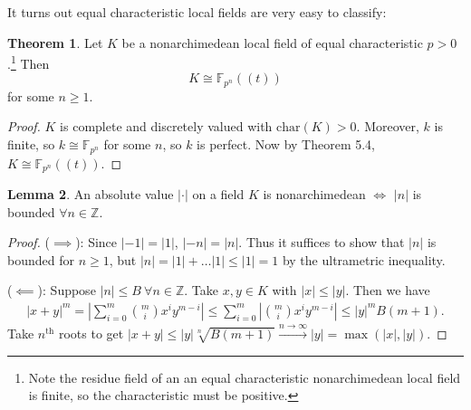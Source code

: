 \documentclass{article}
\theoremstyle{definition}
\newtheorem{theorem}{Theorem}[section]
\newtheorem{lemma}[theorem]{Lemma}
\begin{document}
It turns out equal characteristic local fields are very easy to classify:
\begin{theorem}
    Let $K$ be a nonarchimedean local field of equal characteristic $p>0$.\footnote{Note the residue field of an an equal characteristic nonarchimedean local field is finite, so the characteristic must be positive.} Then \[
    K \cong \mathbb{F}_{p^n}((t))
    \]
    for some $n\ge 1$.
\end{theorem}
\begin{proof}
    $K$ is complete and discretely valued with $\text{char}(K)>0$. Moreover, $k$ is finite, so $k \cong \mathbb{F}_{p^n}$ for some $n$, so $k$ is perfect. Now by Theorem 5.4, $K \cong \mathbb{F}_{p^n}((t))$.
\end{proof}
\begin{lemma}
    An absolute value $|\cdot|$ on a field $K$ is nonarchimedean $\iff$ $|n|$ is bounded $\forall n \in \mathbb{Z}$.
\end{lemma}
\begin{proof}
    ($\implies $): Since $|-1|=|1|$, $|-n|=|n|$. Thus it suffices to show that $|n|$ is bounded for $n\ge 1$, but $|n| = |1| + \ldots |1| \le |1| = 1$ by the ultrametric inequality.
    \vspace{1mm}
     
    ($\impliedby$): Suppose $|n|\le B~\forall n \in \mathbb{Z}$. Take $x,y \in K$ with $|x|\le |y|$. Then we have 
    \begin{align*}
        |x+y|^m = \left|\sum_{i=0}^{m} {m\choose i}x^i y^{m-i}\right| \le \sum_{i=0}^{m} \left|{m\choose i}x^i y^{m-i}\right| \le |y|^m B (m+1).
    \end{align*}
    Take $n^{\text{th}}$ roots to get $|x+y|\le |y|\sqrt[n]{B(m+1)} \stackrel{n \to \infty}{\to} |y| = \max(|x|,|y|)$.
\end{proof}

\end{document}
